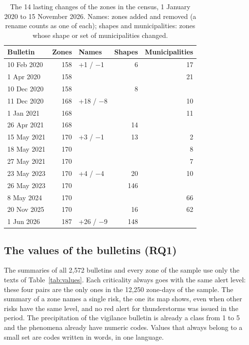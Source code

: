\documentclass[review,authoryear,12pt]{elsarticle}
\begin{document}
\begin{table}[t]
\centering
\caption{The 14 lasting changes of the zones in the census, 1 January 2020 to
15 November 2026. Names: zones added and removed (a rename counts as one of
each); shapes and municipalities: zones whose shape or set of municipalities
changed.}
\label{tab:versions}
\small
\begin{tabular}{@{}lrlrr@{}}
\toprule
Bulletin & Zones & Names & Shapes & Municipalities \\
\midrule
10 Feb 2020 & 158 & +1 / $-$1 & 6 & 17 \\
1 Apr 2020 & 158 & & & 21 \\
10 Dec 2020 & 158 & & 8 & \\
11 Dec 2020 & 168 & +18 / $-$8 & & 10 \\
1 Jan 2021 & 168 & & & 11 \\
26 Apr 2021 & 168 & & 14 & \\
15 May 2021 & 170 & +3 / $-$1 & 13 & 2 \\
18 May 2021 & 170 & & & 8 \\
27 May 2021 & 170 & & & 7 \\
23 May 2023 & 170 & +4 / $-$4 & 20 & 10 \\
26 May 2023 & 170 & & 146 & \\
8 May 2024 & 170 & & & 66 \\
20 Nov 2025 & 170 & & 16 & 62 \\
1 Jun 2026 & 187 & +26 / $-$9 & 148 & \\
\bottomrule
\end{tabular}
\end{table}

\subsection{The values of the bulletins (RQ1)}

The summaries of all 2,572 bulletins and every zone of the sample use only
the texts of Table~\ref{tab:values}. Each criticality always goes with the
same alert level: these four pairs are the only ones in the 12,250 zone-days
of the sample. The summary of a zone names a single risk, the one its map
shows, even when other risks have the same level, and no red alert for
thunderstorms was issued in the period. The precipitation of the vigilance
bulletin is already a class from 1 to 5 and the phenomena already have
numeric codes. Values that always belong to a small set are codes written in
words, in one language.
\end{document}
